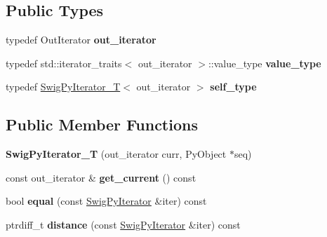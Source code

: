 \subsection*{Public Types}
\begin{DoxyCompactItemize}
\item 
typedef Out\+Iterator {\bfseries out\+\_\+iterator}\hypertarget{classswig_1_1SwigPyIterator__T_aec35545038c3d804975a147253f061e4}{}\label{classswig_1_1SwigPyIterator__T_aec35545038c3d804975a147253f061e4}

\item 
typedef std\+::iterator\+\_\+traits$<$ out\+\_\+iterator $>$\+::value\+\_\+type {\bfseries value\+\_\+type}\hypertarget{classswig_1_1SwigPyIterator__T_a1441e2409c41706ad7aee977165f675e}{}\label{classswig_1_1SwigPyIterator__T_a1441e2409c41706ad7aee977165f675e}

\item 
typedef \hyperlink{classswig_1_1SwigPyIterator__T}{Swig\+Py\+Iterator\+\_\+T}$<$ out\+\_\+iterator $>$ {\bfseries self\+\_\+type}\hypertarget{classswig_1_1SwigPyIterator__T_af10eb8078eb41f1dbca3701f27bd8e73}{}\label{classswig_1_1SwigPyIterator__T_af10eb8078eb41f1dbca3701f27bd8e73}

\end{DoxyCompactItemize}
\subsection*{Public Member Functions}
\begin{DoxyCompactItemize}
\item 
{\bfseries Swig\+Py\+Iterator\+\_\+T} (out\+\_\+iterator curr, Py\+Object $\ast$seq)\hypertarget{classswig_1_1SwigPyIterator__T_aed627e359856103f6e9b2e939fc85d9c}{}\label{classswig_1_1SwigPyIterator__T_aed627e359856103f6e9b2e939fc85d9c}

\item 
const out\+\_\+iterator \& {\bfseries get\+\_\+current} () const \hypertarget{classswig_1_1SwigPyIterator__T_ab452f2d0e15c0dd2757014231d16b4a9}{}\label{classswig_1_1SwigPyIterator__T_ab452f2d0e15c0dd2757014231d16b4a9}

\item 
bool {\bfseries equal} (const \hyperlink{structswig_1_1SwigPyIterator}{Swig\+Py\+Iterator} \&iter) const \hypertarget{classswig_1_1SwigPyIterator__T_ae50a7b89fee4c738d0cf7e9286fecddf}{}\label{classswig_1_1SwigPyIterator__T_ae50a7b89fee4c738d0cf7e9286fecddf}

\item 
ptrdiff\+\_\+t {\bfseries distance} (const \hyperlink{structswig_1_1SwigPyIterator}{Swig\+Py\+Iterator} \&iter) const \hypertarget{classswig_1_1SwigPyIterator__T_a8c5d44ceb861ce9124c69ca6a1ff1a55}{}\label{classswig_1_1SwigPyIterator__T_a8c5d44ceb861ce9124c69ca6a1ff1a55}

\end{DoxyCompactItemize}

